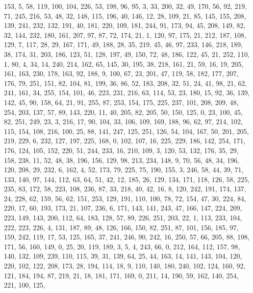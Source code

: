 \begin{DoxyCode}
       153, 5, 58, 119, 100, 104, 226, 53, 198, 96, 95, 3, 33, 200, 32, 49, 170, 56, 92, 219, 71, 245, 216, 53, 48,
       32, 148, 115, 196, 40, 146, 12, 28, 109, 21, 85, 145, 155, 208, 139, 241, 232, 132, 191, 40, 181, 220, 109,
       181, 244, 91, 173, 94, 45, 208, 149, 82, 32, 144, 232, 180, 161, 207, 97, 87, 72, 174, 21, 1, 120, 97, 175,
       21, 212, 187, 108, 129, 7, 117, 28, 29, 167, 171, 49, 188, 28, 35, 219, 45, 46, 97, 233, 146, 218, 189, 38,
       174, 31, 203, 186, 123, 51, 128, 197, 49, 150, 72, 48, 186, 122, 45, 21, 252, 110, 1, 80, 4, 34, 14, 240,
       214, 162, 65, 145, 30, 195, 38, 218, 161, 21, 59, 16, 19, 205, 161, 163, 230, 178, 163, 92, 188, 9, 100, 67,
       23, 201, 47, 119, 58, 182, 177, 207, 176, 79, 251, 151, 82, 104, 81, 199, 36, 86, 52, 183, 208, 32, 51, 24,
       41, 98, 21, 62, 241, 161, 34, 255, 154, 101, 46, 223, 231, 216, 63, 114, 53, 23, 180, 15, 92, 36, 139, 142,
       45, 90, 158, 64, 21, 91, 255, 87, 253, 154, 175, 225, 237, 101, 208, 209, 48, 254, 203, 137, 57, 89, 143,
       220, 11, 40, 205, 82, 205, 50, 150, 125, 0, 23, 100, 45, 82, 251, 249, 23, 3, 216, 17, 90, 104, 33, 106, 109,
       169, 188, 96, 62, 97, 214, 102, 115, 154, 108, 216, 100, 25, 88, 141, 247, 125, 251, 126, 54, 104, 167, 50,
       201, 205, 219, 229, 6, 232, 127, 197, 225, 168, 0, 102, 107, 16, 225, 229, 186, 142, 254, 171, 176, 124, 105,
       152, 220, 51, 244, 233, 16, 210, 109, 3, 120, 53, 132, 176, 35, 29, 158, 238, 11, 52, 48, 38, 196, 156,
       129, 98, 213, 234, 148, 9, 70, 56, 48, 34, 196, 120, 208, 29, 232, 6, 162, 4, 52, 173, 79, 225, 75, 190, 155,
       3, 246, 58, 44, 39, 71, 133, 140, 97, 144, 112, 63, 64, 51, 42, 12, 185, 26, 129, 134, 171, 118, 126, 58,
       225, 235, 83, 172, 58, 223, 108, 236, 87, 33, 218, 40, 42, 16, 8, 120, 242, 191, 174, 137, 24, 228, 62, 159,
       56, 62, 151, 253, 129, 191, 110, 100, 78, 72, 154, 47, 30, 224, 84, 220, 17, 60, 193, 173, 21, 107, 236, 6,
       171, 143, 141, 243, 47, 166, 147, 224, 209, 223, 149, 143, 200, 112, 64, 183, 128, 57, 89, 226, 251, 203, 22,
       1, 113, 233, 104, 222, 223, 226, 4, 131, 187, 89, 48, 126, 166, 150, 82, 251, 87, 101, 156, 185, 97, 159,
       242, 119, 17, 53, 125, 165, 37, 241, 246, 90, 242, 16, 250, 57, 66, 205, 88, 198, 171, 56, 160, 149, 0, 25,
       20, 119, 189, 3, 5, 4, 243, 66, 0, 212, 164, 112, 157, 98, 140, 132, 109, 239, 110, 115, 39, 31, 139, 64, 25,
       44, 163, 14, 141, 143, 104, 120, 220, 102, 122, 208, 173, 28, 194, 114, 18, 9, 110, 140, 180, 240, 102, 124,
       160, 92, 121, 184, 194, 87, 219, 21, 18, 181, 171, 169, 0, 211, 14, 190, 59, 162, 140, 254, 221, 100, 125,

\end{DoxyCode}

